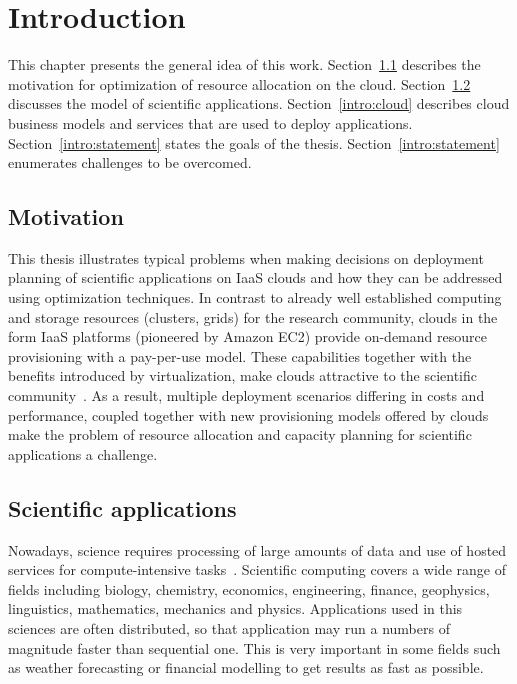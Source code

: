 \chapter{Introduction}
\label{chap:introduction} 

This chapter presents the general idea of this work. Section~\ref{intro:motivation} describes the motivation for optimization of resource allocation on the cloud. Section~\ref{intro:application} discusses the model of scientific applications. Section~\ref{intro:cloud} describes cloud business models and services that are used to deploy applications. Section~\ref{intro:statement} states the goals of the thesis. Section~\ref{intro:statement} enumerates challenges to be overcomed. 

\section{Motivation}
\label{intro:motivation}


This thesis illustrates typical problems when making decisions on deployment planning of scientific applications on IaaS clouds and how they can be addressed using optimization techniques. In contrast to already well established computing and storage resources (clusters, grids) for the research community, clouds in the form IaaS  platforms (pioneered by Amazon EC2) provide on-demand resource provisioning with a pay-per-use model. These capabilities together with the benefits introduced by virtualization, make clouds attractive to the scientific community~\cite{Deelman09}. As a result, multiple deployment scenarios differing in costs and performance, coupled together with new provisioning models offered by clouds make the problem of resource allocation and capacity planning for scientific applications a challenge.

\section{Scientific applications}
\label{intro:application}

Nowadays, science requires processing of large amounts of data and use of hosted services for compute-intensive tasks~\cite{Foster06052005}. Scientific computing covers a wide range of fields including biology, chemistry, economics, engineering, finance, geophysics, linguistics, mathematics, mechanics and physics. Applications used in this sciences are often distributed, so that application may run a numbers of magnitude faster than sequential one. This is very important in some fields such as weather forecasting or financial modelling to get results as fast as possible. 

